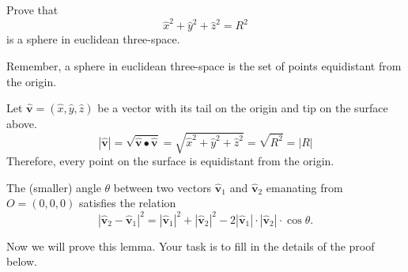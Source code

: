 \documentclass[newpage,hints,handout]{ximera}
\begin{document}
\begin{problem}
  Prove that
  \[
  \hat{x}^2 + \hat{y}^2 + \hat{z}^2 = R^2
  \]
  is a sphere in euclidean three-space.
  
\begin{hint}
  Remember, a sphere in euclidean three-space is the set of points equidistant
  from the origin.
\end{hint}

\begin{freeResponse}
Let $\hat{\mathbf v}= \left(\hat{x},\hat{y}, \hat{z}\right)$ be a vector with its tail on the origin and tip on the surface above.
\[
\left\vert \hat{\mathbf v}\right\vert = \sqrt{\hat{\mathbf v}\bullet \hat{\mathbf v}} = \sqrt{ \hat{x}^2+\hat{y}^2 + \hat{z}^2}= \sqrt{R^2} = \left\vert R \right\vert
\] 
Therefore, every point on the surface is equidistant from the origin.
\end{freeResponse}  
\end{problem}


\begin{lemma}
\label{110} The (smaller) angle $\theta$ between two
vectors $\hat{\mathbf v}_{1}$ and $\hat{\mathbf v}_{2}$ emanating from
$O=\left(0,0,0\right)$ satisfies the relation%
\[
\left\lvert \hat{\mathbf v}_{2}-\hat{\mathbf v}_{1}\right\rvert ^{2}
=\left\lvert \hat{\mathbf v}_{1}\right\rvert^{2}
+\left\lvert \hat{\mathbf v}_{2}\right\rvert^{2}
-2\left\lvert\hat{\mathbf v}_{1}\right\rvert \cdot
\left\lvert \hat{\mathbf v}_{2}\right\rvert \cdot \cos\theta.
\]
\end{lemma}

Now we will prove this lemma. Your task is to fill in the details of
the proof below.
\end{document}
